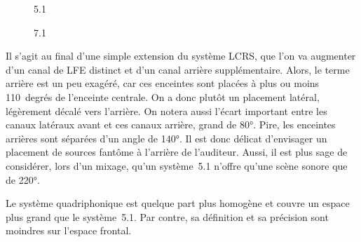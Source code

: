 \documentclass[
  letterpaper,
  DIV=11,
  numbers=noendperiod]{scrreprt}
\begin{document}
\begin{figure}

\begin{minipage}[t]{0.50\linewidth}

{\centering 


\caption{5.1}

}

\end{minipage}%
%
\begin{minipage}[t]{0.50\linewidth}

{\centering 


\caption{7.1}

}

\end{minipage}%

\end{figure}

Il s'agit au final d'une simple extension du système LCRS, que l'on va
augmenter d'un canal de LFE distinct et d'un canal arrière
supplémentaire. Alors, le terme arrière est un peu exagéré, car ces
enceintes sont placées à plus ou moins 110~degrés de l'enceinte
centrale. On a donc plutôt un placement latéral, légèrement décalé vers
l'arrière. On notera aussi l'écart important entre les canaux latéraux
avant et ces canaux arrière, grand de 80°. Pire, les enceintes arrières
sont séparées d'un angle de 140°. Il est donc délicat d'envisager un
placement de sources fantôme à l'arrière de l'auditeur. Aussi, il est
plus sage de considérer, lors d'un mixage, qu'un système~5.1 n'offre
qu'une scène sonore que de 220°.

\begin{tcolorbox}[enhanced jigsaw, leftrule=.75mm, arc=.35mm, bottomtitle=1mm, colback=white, colbacktitle=quarto-callout-note-color!10!white, opacityback=0, left=2mm, rightrule=.15mm, opacitybacktitle=0.6, breakable, toptitle=1mm, titlerule=0mm, bottomrule=.15mm, toprule=.15mm, coltitle=black, title=\textcolor{quarto-callout-note-color}{\faInfo}\hspace{0.5em}{Note}]

Le système quadriphonique est quelque part plus homogène et couvre un
espace plus grand que le système~5.1. Par contre, sa définition et sa
précision sont moindres sur l'espace frontal.

\end{tcolorbox}
\end{document}
